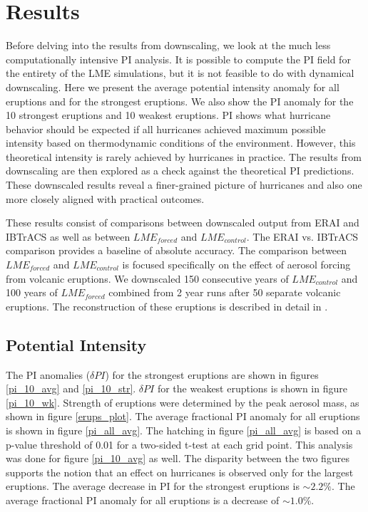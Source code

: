 \section{Results}
\label{results}
Before delving into the results from downscaling, we look at the much less computationally intensive PI analysis. It is possible to compute the PI field for the entirety of the LME simulations, but it is not feasible to do with dynamical downscaling. Here we present the average potential intensity anomaly for all eruptions and for the strongest eruptions. We also show the PI anomaly for the 10 strongest eruptions and 10 weakest eruptions. PI shows what hurricane behavior should be expected if all hurricanes achieved maximum possible intensity based on thermodynamic conditions of the environment. However, this theoretical intensity is rarely achieved by hurricanes in practice. The results from downscaling are then explored as a check against the theoretical PI predictions. These downscaled results reveal a finer-grained picture of hurricanes and also one more closely aligned with practical outcomes.     
\par
These results consist of comparisons between downscaled output from ERAI and IBTrACS as well as between $LME_{forced}$ and $LME_{control}$. The ERAI vs. IBTrACS comparison provides a baseline of absolute accuracy. The comparison between $LME_{forced}$ and $LME_{control}$ is focused specifically on the effect of aerosol forcing from volcanic eruptions. We downscaled 150 consecutive years of $LME_{control}$ and 100 years of $LME_{forced}$ combined from 2 year runs after 50 separate volcanic eruptions. The reconstruction of these eruptions is described in detail in \cite{erups_recon}.    

\subsection{Potential Intensity}
The PI anomalies ($\delta PI$) for the strongest eruptions are shown in figures \ref{pi_10_avg} and \ref{pi_10_str}. $\delta PI$ for the weakest eruptions is shown in figure \ref{pi_10_wk}. Strength of eruptions were determined by the peak aerosol mass, as shown in figure \ref{erups_plot}. The average fractional PI anomaly for all eruptions is shown in figure \ref{pi_all_avg}. The hatching in figure \ref{pi_all_avg} is based on a p-value threshold of 0.01 for a two-sided t-test at each grid point. This analysis was done for figure \ref{pi_10_avg} as well. The disparity between the two figures supports the notion that an effect on hurricanes is observed only for the largest eruptions. The average decrease in PI for the strongest eruptions is ${\sim}2.2\%$. The average fractional PI anomaly for all eruptions is a decrease of ${\sim}1.0\%$.   

